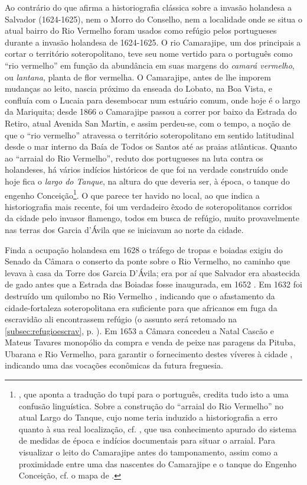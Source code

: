 Ao contrário do que afirma a historiografia clássica sobre a invasão holandesa a Salvador (1624-1625), nem o Morro do Conselho, nem a localidade onde se situa o atual bairro do Rio Vermelho foram usados como refúgio pelos portugueses durante a invasão holandesa de 1624-1625. O rio Camarajipe, um dos principais a cortar o território soteropolitano, teve seu nome vertido para o português como ``rio vermelho'' em função da abundância em suas margens do \textit{camará vermelho}, ou \textit{lantana}, planta de flor vermelha. O Camarajipe, antes de lhe imporem mudanças ao leito, nascia próximo da enseada do Lobato, na Boa Vista, e confluía com o Lucaia para desembocar num estuário comum, onde hoje é o largo da Mariquita; desde 1866 o Camarajipe passou a correr por baixo da Estrada do Retiro, atual Avenida San Martin, e assim perdeu-se, com o tempo, a noção de que o ``rio vermelho'' atravessa o território soteropolitano em sentido latitudinal desde o mar interno da Baía de Todos os Santos até as praias atlânticas. Quanto ao  ``arraial do Rio Vermelho'', reduto dos portugueses na luta contra os holandeses, há vários indícios históricos de que foi na verdade construído onde hoje fica o \textit{largo do Tanque}, na altura do que deveria ser, à época, o tanque do engenho Conceição\footnote{, que aponta a tradução do tupi para o português, credita tudo isto a uma confusão linguística. Sobre a construção do ``arraial do Rio Vermelho'' no atual Largo do Tanque, cujo nome teria induzido a historiografia a erro quanto à sua real localização, cf. , que usa conhecimento apurado do sistema de medidas de época e indícios documentais para situar o arraial. Para visualizar o leito do Camarajipe antes do tamponamento, assim como a proximidade entre uma das nascentes do Camarajipe e o tanque do Engenho Conceição, cf. o mapa de .}. O que parece ter havido no local, ao que indica a historiografia mais recente, foi um verdadeiro êxodo de soteropolitanos corridos da cidade pelo invasor flamengo, todos em busca de refúgio, muito provavelmente nas terras dos Garcia d'Ávila que se iniciavam ao norte da cidade.

Finda a ocupação holandesa em 1628 o tráfego de tropas e boiadas exigiu do Senado da Câmara o conserto da ponte sobre o Rio Vermelho, no caminho que levava à casa da Torre dos Garcia D'Ávila; era por aí que Salvador era abastecida de gado antes que a Estrada das Boiadas fosse inaugurada, em 1652 \cite[pp.~315-316]{azevedo_povoamento_1969}. Em 1632 foi destruído um quilombo no Rio Vermelho \cite[p.~67]{VASCONCELOS2002}, indicando que o afastamento da cidade-fortaleza soteropolitana era suficiente para que africanos em fuga da escravidão ali encontrassem refúgio (o assunto será retomado na \autoref{subsec:refugioescrav}, p. \pageref{subsec:refugioescrav}). Em 1653 a Câmara concedeu a Natal Cascão e Mateus Tavares monopólio da compra e venda de peixe nas paragens da Pituba, Ubarana e Rio Vermelho, para garantir o fornecimento destes víveres à cidade \cite[p.~259]{azevedo_povoamento_1969}, indicando uma das vocações econômicas da futura freguesia.

